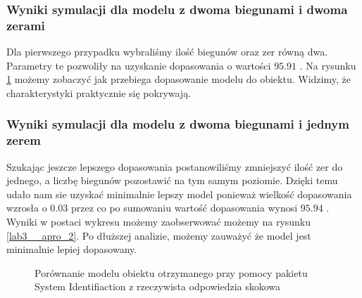 \subsubsection{Wyniki symulacji dla modelu z dwoma biegunami i dwoma zerami}
Dla pierwszego przypadku wybraliśmy ilość biegunów oraz zer równą dwa. Parametry te pozwoliły na uzyskanie dopasowania o wartości $ \num{95.91} $ \text{\%}. Na rysunku \ref{lab3_apro_1} możemy zobaczyć jak przebiega dopasowanie modelu do obiektu. Widzimy, że charakterystyki praktycznie się pokrywają. 

\subsubsection{Wyniki symulacji dla modelu z dwoma biegunami i jednym zerem}
Szukając jeszcze lepszego dopasowania postanowiliśmy zmniejszyć ilość zer do jednego, a liczbę biegunów pozostawić na tym samym poziomie. Dzięki temu udało nam sie uzyskać minimalnie lepszy model ponieważ wielkość dopasowania wzrosła o $\num{0.03}$ \text{\%} przez co po sumowaniu wartość dopasowania wynosi $\num{95.94}$ \text{\%}. Wyniki w postaci wykresu możemy zaobserwować możemy na rysunku \ref{lab3__apro_2}. Po dłuższej analizie, możemy zauważyć że model jest minimalnie lepiej dopasowany. 

\begin{figure}[t]
    \centering
    \caption{Porównanie modelu obiektu otrzymanego przy pomocy pakietu System Identifiaction
z rzeczywista odpowiedzia skokowa}
    \label{lab3_apro_1}
\end{figure}

